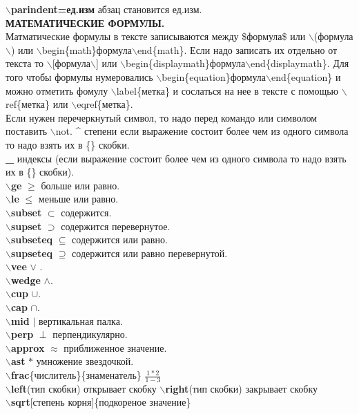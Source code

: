\documentclass{article}
\newcommand{\bb}[1]{{\bfseries $\backslash$#1}} %
\begin{document}
\bb{parindent=ед.изм} абзац становится ед.изм.\\

{\bfseries МАТЕМАТИЧЕСКИЕ ФОРМУЛЫ.}\\
Матматические формулы в тексте записываются между \$формула\$ или $\backslash$(формула$\backslash$) или $\backslash$begin\{math\}формула$\backslash$end\{math\}. Если надо записать их отдельно от текста то $\backslash$[формула$\backslash$] или $\backslash$begin\{displaymath\}формула$\backslash$end\{displaymath\}. Для того чтобы формулы нумеровались $\backslash$begin\{equation\}формула$\backslash$end\{equation\} и можно отметить фомулу $\backslash$label\{метка\} и сослаться на нее в тексте с помощью $\backslash$ref\{метка\} или $\backslash$eqref\{метка\}.\\

Если нужен перечеркнутый символ, то надо перед командо или символом поставить $\backslash$not. 
{\bfseries \^{}} степени  если выражение состоит более чем из одного символа то надо взять их в \{\} скобки.\\
{\bfseries \_} индексы (если выражение состоит более чем из одного символа то надо взять их в \{\} скобки).\\
\bb{ge} $\ge$ больше или равно.\\
\bb{le} $\le$ меньше или равно.\\
\bb{subset} $\subset$ содержится.\\
\bb{supset} $\supset$ содержится перевернутое.\\
\bb{subseteq} $\subseteq$ содержится или равно.\\
\bb{supseteq} $\supseteq$ содержится или равно перевернутой.\\
\bb{vee} $\vee$ .\\
\bb{wedge} $\wedge$.\\
\bb{cup} $\cup$.\\
\bb{cap} $\cap$.\\
\bb{mid} $\mid$ вертикальная палка.\\
\bb{perp} $\perp$ перпендикулярно.\\
\bb{approx} $\approx$ приближенное значение.\\
\bb{ast} $\ast$ умножение звездочкой.\\
\bb{frac}\{числитель\}\{знаменатель\} $\frac{1*2}{1-3}$\\
\bb{left}(тип скобки) открывает скобку   \bb{right}(тип скобки) закрывает скобку\\
\bb{sqrt}[степень корня]\{подкореное значение\}\\
\end{document}
